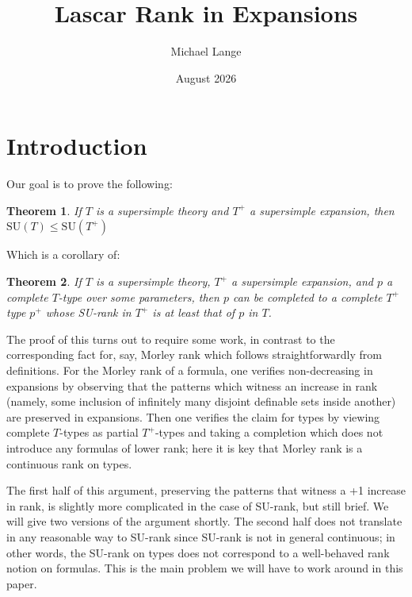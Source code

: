 \documentclass{article}
\title{Lascar Rank in Expansions}
\author{Michael Lange}
\date{August 2026}
\newtheorem{theorem}{Theorem}[section]
\theoremstyle{remark}
\theoremstyle{definition}
\begin{document}
\onehalfspacing
\setlength{\headheight}{14pt}   %
\setlength{\headsep}{8pt} 
\newpage
\maketitle

\section{Introduction}

Our goal is to prove the following:


\begin{theorem}
    If $T$ is a supersimple theory and $T^+$ a supersimple expansion, then $\mathrm{SU}(T)\leq \mathrm{SU}(T^+)$
\end{theorem}
\noindent Which is a corollary of:
\begin{theorem}\label{HeaderThm2}
    If $T$ is a supersimple theory, $T^+$ a supersimple expansion, and $p$ a complete $T$-type over some parameters, then $p$ can be completed to a complete $T^+$ type $p^+$ whose SU-rank in $T^+$ is at least that of $p$ in $T$.
\end{theorem}

The proof of this turns out to require some work, in contrast to the corresponding fact for, say, Morley rank which follows straightforwardly from definitions. For the Morley rank of a formula, one verifies non-decreasing in expansions by observing that the patterns which witness an increase in rank (namely, some inclusion of infinitely many disjoint definable sets inside another) are preserved in expansions. Then one verifies the claim for types by viewing complete $T$-types as partial $T^+$-types and taking a completion which does not introduce any formulas of lower rank; here it is key that Morley rank is a continuous rank on types.

The first half of this argument, preserving the patterns that witness a +1 increase in rank, is slightly more complicated in the case of SU-rank, but still brief. We will give two versions of the argument shortly. The second half does not translate in any reasonable way to SU-rank since SU-rank is not in general continuous; in other words, the SU-rank on types does not correspond to a well-behaved rank notion on formulas. This is the main problem we will have to work around in this paper.
\end{document}
